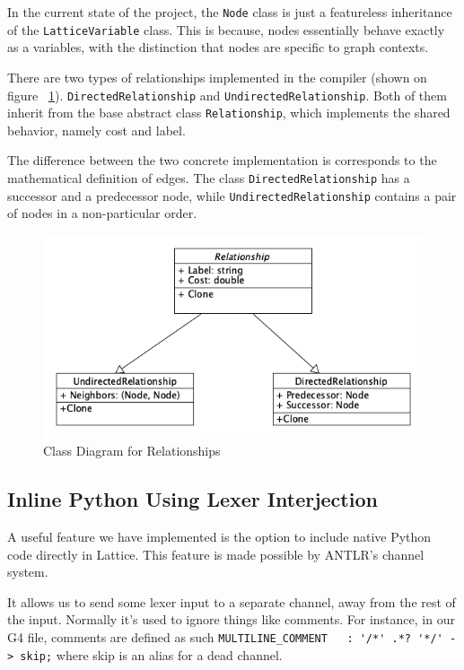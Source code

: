 In the current state of the project, the \lstinline{Node} class is just a featureless inheritance of the \lstinline{LatticeVariable} class.
This is because, nodes essentially behave exactly as a variables, with the distinction that nodes are specific to graph contexts.

There are two types of relationships implemented in the compiler (shown on figure ~\ref{fig:relationships}).
\lstinline{DirectedRelationship} and \lstinline{UndirectedRelationship}.
Both of them inherit from the base abstract class \lstinline{Relationship}, which implements the shared behavior,
namely cost and label.

The difference between the two concrete implementation is corresponds to the mathematical definition of edges.
The class \lstinline{DirectedRelationship} has a successor and a predecessor node, while \lstinline{UndirectedRelationship}
contains a pair of nodes in a non-particular order.

\begin{figure}[H]
\centering
\includegraphics[width=12cm]{figures/implementation_section/relationships}
\caption{Class Diagram for Relationships}
\label{fig:relationships}
\end{figure}


\subsection{Inline Python Using Lexer Interjection}
A useful feature we have implemented is the option to include native Python code directly in Lattice.
This feature is made possible by ANTLR's channel system.

It allows us to send some lexer input to a separate channel, away from the rest of the input.
Normally it's used to ignore things like comments.
For instance, in our G4 file, comments are defined as such \lstinline{MULTILINE_COMMENT   : '/*' .*? '*/' -> skip;}
where skip is an alias for a dead channel.

